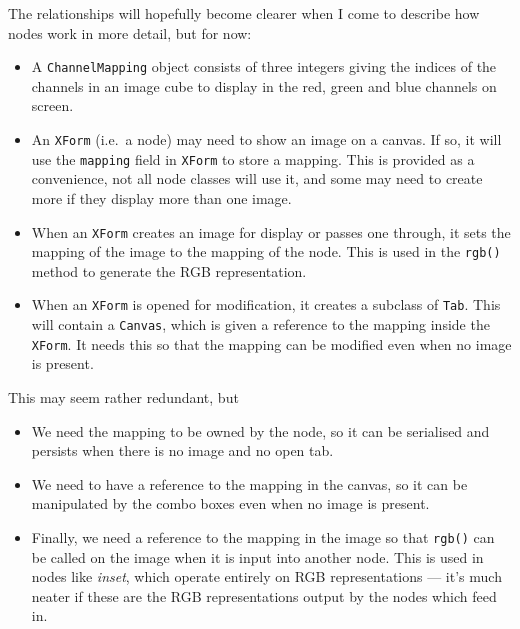The relationships will hopefully become clearer when I come to describe how nodes work in more
detail, but for now:
\begin{itemize}
\item A \texttt{ChannelMapping} object consists of three integers giving the indices of 
the channels in an image cube to display in the red, green and blue channels on screen.
\item An \texttt{XForm} (i.e.\ a node) may need to show an image on a canvas. If so, it 
will use the \texttt{mapping} field in \texttt{XForm} to store a mapping. This is provided
as a convenience, not all node classes will use it, and some may need to create more if they 
display more than one image.
\item When an \texttt{XForm} creates an image for display or passes
one through, it sets the mapping of the image to the mapping of the node. This is used in the
\texttt{rgb()} method to generate the RGB representation.
\item When an \texttt{XForm} is opened for modification, it creates a subclass of \texttt{Tab}.
This will contain a \texttt{Canvas}, which is given a reference to the mapping inside the
\texttt{XForm}. It needs this so that the mapping can be modified even when no image is present.
\end{itemize}
This may seem rather redundant, but
\begin{itemize}
\item We need the mapping to be owned by the node, so it can be serialised and persists when
there is no image and no open tab.
\item We need to have a reference to the mapping in the canvas, so it can be manipulated by
the combo boxes even when no image is present.
\item Finally, we need a reference to the mapping in the image so that \texttt{rgb()} can be called
on the image when it is input into another node. This is used in nodes like \emph{inset}, which
operate entirely on RGB representations --- it's much neater if these are the RGB representations
output by the nodes which feed in.
\end{itemize}


